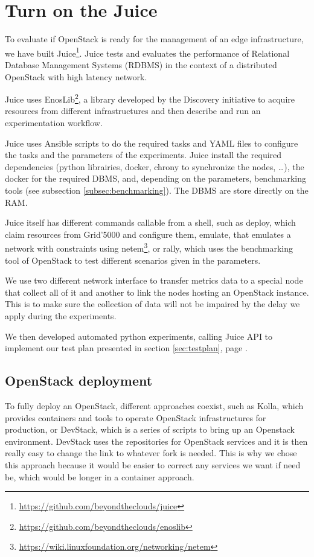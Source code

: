 \section{Turn on the Juice}


To evaluate if OpenStack is ready for the management of an edge infrastructure, we have built Juice\footnote{\url{https://github.com/beyondtheclouds/juice}}. Juice tests and evaluates the performance of Relational Database Management Systems (RDBMS) in the context of a distributed OpenStack with high latency network.

Juice uses EnosLib\footnote{\url{https://github.com/beyondtheclouds/enoslib}}, a library developed by the Discovery initiative to acquire resources from different infrastructures and then describe and run an experimentation workflow.

Juice uses Ansible scripts to do the required tasks and YAML files to configure the tasks and the parameters of the experiments. Juice install the required dependencies (python librairies, docker, chrony to synchronize the nodes, \dots), the docker for the required DBMS, and, depending on the parameters, benchmarking tools (see subsection \ref{subsec:benchmarking}). The DBMS are store directly on the RAM.

Juice itself has different commands callable from a shell, such as deploy, which claim resources from Grid'5000 and configure them, emulate, that emulates a network with constraints using netem\footnote{\url{https://wiki.linuxfoundation.org/networking/netem}}, or rally, which uses the benchmarking tool of OpenStack to test different scenarios given in the parameters.

We use two different network interface to transfer metrics data to a special node that collect all of it and another to link the nodes hosting an OpenStack instance. This is to make sure the collection of data will not be impaired by the delay we apply during the experiments.

We then developed automated python experiments, calling Juice API to implement our test plan presented in section \ref{sec:testplan}, page \pageref{sec:testplan}.

\subsection{OpenStack deployment}

To fully deploy an OpenStack, different approaches coexist, such as Kolla, which provides containers and tools to operate OpenStack infrastructures for production, or DevStack, which is a series of scripts to bring up an Openstack environment. DevStack uses the repositories for OpenStack services and it is then really easy to change the link to whatever fork is needed. This is why we chose this approach because it would be easier to correct any services we want if need be, which would be longer in a container approach.

